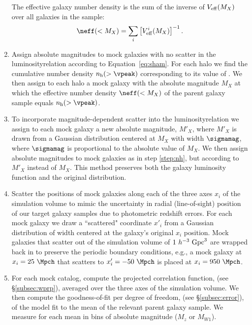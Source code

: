 \documentclass[twocolumn,apj,iop,tighten]{emulateapj2}
\begin{document}
\begin{enumerate}[leftmargin=0pt, itemindent=24pt, listparindent=10pt, label=(\arabic*), nosep]
The effective galaxy number density is the sum of the inverse of $V_{\rm eff}(M_X)$ over all galaxies in the sample:
%
\begin{equation}\label{eq:neff}
  \neff(<M_X) = \sum_i \left[ V^i_{\rm eff}(M_X) \right]^{-1}.
\end{equation}
%
\item \label{step:nh}
Assign absolute magnitudes to mock galaxies with no scatter in the luminosity\textendash \vpeak relation according to Equation~\ref{eq:sham}. For each halo we find the cumulative number density $n_{\rm h}(>\vpeak)$ corresponding to its value of \vpeak. We then assign to each halo a mock galaxy with the absolute magnitude $M_X$ at which the effective number density $\neff(<M_X)$ of the parent galaxy sample equals $n_{\rm h}(>\vpeak)$.
%
\item \label{step:sham_scatter}
To incorporate magnitude-dependent scatter into the luminosity\textendash \vpeak relation we assign to each mock galaxy a new absolute magnitude, $M'_X$, where $M'_X$ is drawn from a Gaussian distribution centered at $M_X$ with width $\sigmamag$, where $\sigmamag$ is proportional to the absolute value of $M_X$. We then assign absolute magnitudes to mock galaxies as in step \ref{step:nh}, but according to $M'_X$ instead of $M_X$. This method preserves both the galaxy luminosity function and the original \vpeak distribution.
%
\item \label{step:los_scatter}
Scatter the positions of mock galaxies along each of the three axes $x_i$ of the simulation volume to mimic the uncertainty in radial (line-of-sight) position of our target galaxy samples due to photometric redshift errors. For each mock galaxy we draw a ``scattered" coordinate $x'_i$ from a Gaussian distribution of width \sigmalos centered at the galaxy's original $x_i$ position. Mock galaxies that scatter out of the simulation volume of $1~h^{-3}\ {\rm Gpc}^3$ are wrapped back in to preserve the periodic boundary conditions, e.g., a mock galaxy at $x_i=25~\Mpch$ that scatters to $x'_i=-50~\Mpch$ is placed at $x_i=950~\Mpch$.
%
\item \label{step:model_wp}
For each mock catalog, compute the projected correlation function, \wprp (see \S\ref{subsec:wprp}), averaged over the three axes of the simulation volume. We then compute the goodness-of-fit per degree of freedom, \chisqred (see \S\ref{subsec:error}), of the model fit to the mean \wprp of the relevant parent galaxy sample. We measure \chisqred for each mean \wprp in bins of absolute magnitude ($M_z$ or $M_{W1}$).

\end{enumerate}
\end{document}
